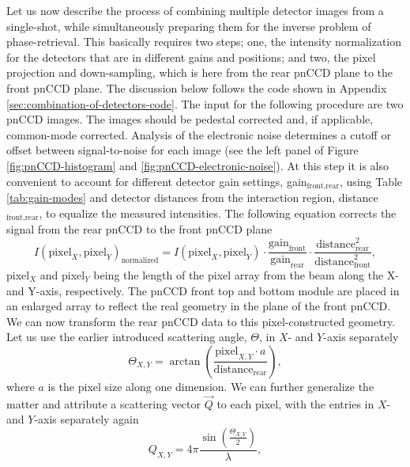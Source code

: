 %
Let us now describe the process of combining multiple detector images from a single-shot, while simultaneously preparing them for the inverse problem of phase-retrieval. This basically requires two steps; one, the intensity normalization for the detectors that are in different gains and positions; and two, the pixel projection and down-sampling, which is here from the rear pnCCD plane to the front pnCCD plane. The discussion below follows the code shown in Appendix \ref{sec:combination-of-detectors-code}. The input for the following procedure are two pnCCD images. The images should be pedestal corrected and, if applicable, common-mode corrected. Analysis of the electronic noise determines a cutoff or offset between signal-to-noise for each image (see the left panel of Figure \ref{fig:pnCCD-histogram} and \ref{fig:pnCCD-electronic-noise}). At this step it is also convenient to account for different detector gain settings, gain$_{\text{front,rear}}$, using Table \ref{tab:gain-modes} and detector distances from the interaction region, distance$_{\text{front,rear}}$, to equalize the measured intensities. The following equation corrects the signal from the rear pnCCD to the front pnCCD plane
\begin{equation}
I(\text{pixel}_{X},\text{pixel}_{Y})_{\text{normalized}} = I(\text{pixel}_{X},\text{pixel}_{Y})\cdot \frac{\text{gain}_{\text{front}}}{\text{gain}_{\text{rear}}} \cdot \frac{\text{distance}_{\text{rear}}^{2}}{\text{distance}_{\text{front}}^{2}},
\end{equation}
pixel$_{X}$ and pixel$_{Y}$ being the length of the pixel array from the beam along the X- and Y-axis, respectively. The pnCCD front top and bottom module are placed in an enlarged array to reflect the real geometry in the plane of the front pnCCD. We can now transform the rear pnCCD data to this pixel-constructed geometry. Let us use the earlier introduced scattering angle, $\Theta$, in $X$- and $Y$-axis separately
\begin{equation}
\Theta_{X,Y} = \arctan\left(\frac{\text{pixel}_{X,Y} \cdot a}{\text{distance}_{\text{rear}}}\right),
\label{eqn:scattering-angle}
\end{equation}
where $a$ is the pixel size along one dimension. We can further generalize the matter and attribute a scattering vector $\vec{Q}$ to each pixel, with the entries in $X$- and $Y$-axis separately again
\begin{equation}
Q_{X,Y} = 4 \pi \frac{\sin\left(\frac{\Theta_{X,Y}}{2}\right)}{\lambda},
\label{eqn:q-vector}
\end{equation}
